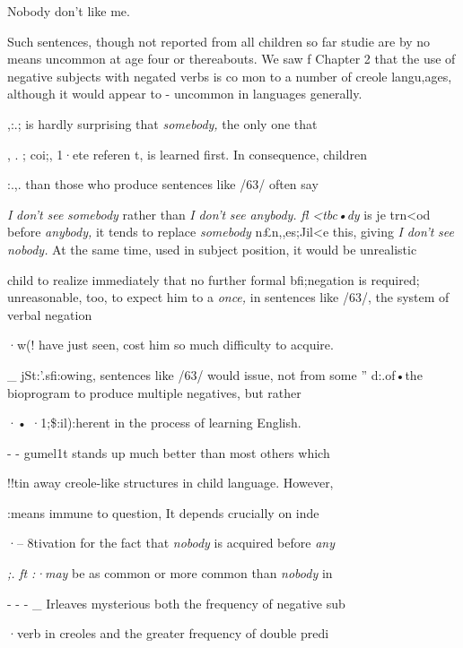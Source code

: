 \ea\label{ex:63}
 Nobody don't like me. 
\z

Such sentences, though not reported from all children so far studie are by no means uncommon at age four or thereabouts. We saw f Chapter 2 that the use of negative subjects with negated verbs is co mon to a number of creole langu,ages, although it would appear to - uncommon in languages generally.

,:.; is hardly surprising that \textit{somebo}\textit{d}\textit{y,} the only one that

, . ; coi;, 1·ete referen t, is learned first. In consequence, children

:.,. than those who produce sentences like /63/ often say

\textit{I} \textit{don't} \textit{see} \textit{somebody} rather than \textit{I} \textit{don't} \textit{see} \textit{anybody.} \textit{fl} \textit{{\textless}tbc•dy} is je trn{\textless}od before \textit{anybody,} it tends to replace \textit{somebo}\textit{d}\textit{y} n£n,,es;Jil{\textless}e this, giving \textit{I} \textit{don't} \textit{see nobody.} At the same time, used in subject position, it would be unrealistic

child to realize immediately that no further formal bfi;negation is required; unreasonable, too, to expect him to
 a \textit{once,} in sentences like /63/, the system of verbal negation
 

·w(! have just seen, cost him so much difficulty to acquire.

\_ jSt:'.sfi:owing, sentences like /63/ would issue, not from some '' d:.of•the bioprogram to produce multiple negatives, but rather

·• ·1;\$:il):herent in the process of learning English.

- - gumel1t stands up much better than most others which

!!tin away creole-like structures in child language. However,

  :means immune to question, It depends crucially on inde 

·-- 8tivation for the fact that \textit{nobody }is acquired before \textit{any\-}

\textit{;.} \textit{ft} \textit{:}\textit{·}\textit{may} be as common or more common than \textit{nobo}\textit{d}\textit{y} in

- - - \_ Irleaves mysterious both the frequency of negative sub\-

·verb in creoles and the greater frequency of double predi\-

